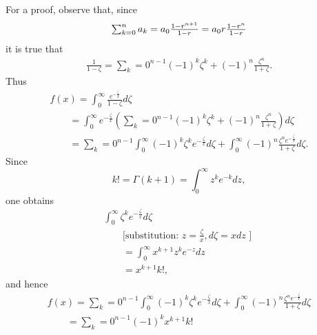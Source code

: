 {\color{OliveGreen}
\bproof

For a proof, observe that,
since
\begin{equation}
\begin{array}{l}
\sum_{k=0}^n a_k =a_0 {1-r^{n+1}\over 1-r} =a_0 r{1-r^{n}\over 1-r}
\end{array}
\label{2011-m-ch-dsee12}
\end{equation}
it is true that
\begin{equation}
\begin{array}{l}
\frac{1}{1-\zeta}=\sum_k=0^{n-1} (-1)^k \zeta^k + (-1)^n \frac{\zeta^n}{1+\zeta}.
\end{array}
\label{2011-m-ch-dsee13}
\end{equation}
Thus
\begin{equation}
\begin{array}{l}
f(x) =\int_0^\infty \frac{e^{-\frac{\zeta}{x}}}{1-\zeta}d\zeta \\
\qquad =
\int_0^\infty  e^{-\frac{\zeta}{x}}\left(
\sum_k=0^{n-1} (-1)^k \zeta^k + (-1)^n \frac{\zeta^n}{1+\zeta}
\right)
d\zeta \\
\qquad =
\sum_k=0^{n-1}\int_0^\infty (-1)^k \zeta^k  e^{-\frac{\zeta}{x}}   d\zeta
 +
\int_0^\infty (-1)^n \frac{\zeta^ne^{-\frac{\zeta}{x}}}{1+\zeta}
d\zeta  .
\end{array}
\label{2011-m-ch-dsee14}
\end{equation}
Since
\begin{equation}
k!= \Gamma(k+1)=    \int_0^\infty z^k e^{-k} dz,
\label{2011-m-ch-dsee15}
\end{equation}
one obtains
\begin{equation}
\begin{array}{l}
\int_0^\infty  \zeta^k  e^{-\frac{\zeta}{x}}   d\zeta     \\
\qquad \textrm{[substitution:  }z=\frac{\zeta}{x}, d \zeta =x dz  \textrm{ ]  } \\
\qquad = \int_0^\infty x^{k+1} z^k  e^{-z}   dz
\\
\qquad =  x^{k+1} k! ,
\end{array}
\label{2011-m-ch-dsee16}
\end{equation}
and hence
\begin{equation}
\begin{array}{l}
f(x)  =
\sum_k=0^{n-1}\int_0^\infty (-1)^k \zeta^k  e^{-\frac{\zeta}{x}}   d\zeta
 +
\int_0^\infty (-1)^n \frac{\zeta^ne^{-\frac{\zeta}{x}}}{1+\zeta}
d\zeta  \\
\qquad =
\sum_k=0^{n-1}  (-1)^k x^{k+1} k!

\end{array}
\end{equation}}
